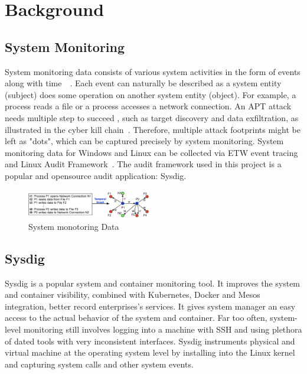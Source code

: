 \section{Background}
\subsection{System Monitoring}
System monitoring data consists of various system activities in the form of events along with time~~\cite{backtracking, backtracking2, taser,wormlog}. Each event can naturally be described as a system entity (subject) does some operation on another system entity (object). For example, a process reads a file or a process accesses a network connection. An APT attack needs multiple step to succeed , such as target discovery and data exfiltration, as illustrated in the cyber kill chain~\cite{killchain}. Therefore, multiple attack footprints might be left as "dots", which can be captured precisely by system monitoring. System monitoring data for Windows and Linux can be collected via ETW event tracing~\cite{etw} and Linux Audit Framework~\cite{auditd}. The audit framework used in this project is a popular and opensource audit application: Sysdig.
\begin{figure}
	\centering
	\includegraphics[width=0.48\textwidth]{temporal-graph.jpg}
	\caption{System monotoring Data}
	\label{fig:temporalGraph}
\end{figure}
\subsection{Sysdig}
Sysdig is a popular system and container monitoring tool. It improves the system and container visibility, combined with Kubernetes, Docker and Mesos integration, better record enterprises's services. It gives system manager an easy access to the actual behavior of the system and container. Far too often, system-level monitoring still involves logging into a machine with SSH and using plethora of dated tools with very inconsistent interfaces. Sysdig instruments physical and virtual machine at the operating system level by installing into the Linux kernel and capturing system calls and other system events.
